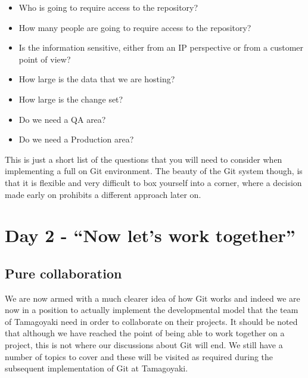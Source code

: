 \begin{itemize}
\item Who is going to require access to the repository?
\item How many people are going to require access to the repository?
\item Is the information sensitive, either from an IP perspective or from a customer point of view?
\item How large is the data that we are hosting?
\item How large is the change set?
\item Do we need a QA area?
\item Do we need a Production area?
\end{itemize}

This is just a short list of the questions that you will need to consider when implementing a full on Git environment.
The beauty of the Git system though, is that it is flexible and very difficult to box yourself into a corner, where a decision made early on prohibits a different approach later on.

\section{Day 2 - ``Now let's work together''}
\subsection{Pure collaboration}
We are now armed with a much clearer idea of how Git works and indeed we are now in a position to actually implement the developmental model that the team of Tamagoyaki need in order to collaborate on their projects.
It should be noted that although we have reached the point of being able to work together on a project, this is not where our discussions about Git will end.
We still have a number of topics to cover and these will be visited as required during the subsequent implementation of Git at Tamagoyaki.

